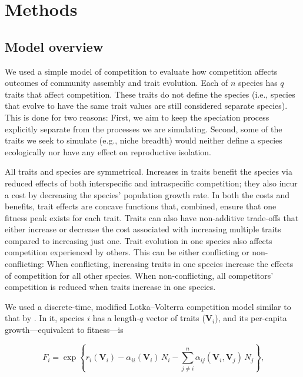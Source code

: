 
\section*{Methods}


\subsection*{Model overview}

We used a simple model of competition to evaluate how competition affects
outcomes of community assembly and trait evolution.
Each of $n$ species has $q$ traits that affect competition.
These traits do not define the species (i.e., species that evolve to have
the same trait values are still considered separate species).
This is done for two reasons:
First, we aim to keep the speciation process explicitly
separate from the processes we are simulating.
Second, some of the traits we seek to simulate (e.g., niche breadth)
would neither define a species ecologically nor 
have any effect on reproductive isolation.

All traits and species are symmetrical.
Increases in traits benefit the species via reduced
effects of both interspecific and intraspecific competition;
they also incur a cost by decreasing the species' population growth rate.
In both the costs and benefits, trait effects are concave functions that,
combined, ensure that one fitness peak exists for each trait.
Traits can also have non-additive trade-offs that either increase or decrease
the cost associated with increasing multiple traits compared to increasing
just one.
Trait evolution in one species also affects competition experienced by others.
This can be either conflicting or non-conflicting:
When conflicting, increasing traits in one species increase the effects of
competition for all other species.
When non-conflicting, all competitors' competition is reduced when traits
increase in one species.

We used a discrete-time, modified Lotka--Volterra competition model similar to
that by \citet{Northfield:2013if}.
In it, species $i$ has a length-$q$ vector of traits ($\mathbf{V}_i$), and
its per-capita growth---equivalent to fitness---is

\begin{equation} \label{eq:fitness}
    F_{i} = \exp \left\{ r_i(\mathbf{V}_i) - 
        \alpha_{ii}(\mathbf{V}_i) \, N_i - \sum_{j \ne i}^{n}{
            \alpha_{ij}(\mathbf{V}_i, \mathbf{V}_j) \, N_j}  
    \right\}\textrm{,}
\end{equation}

